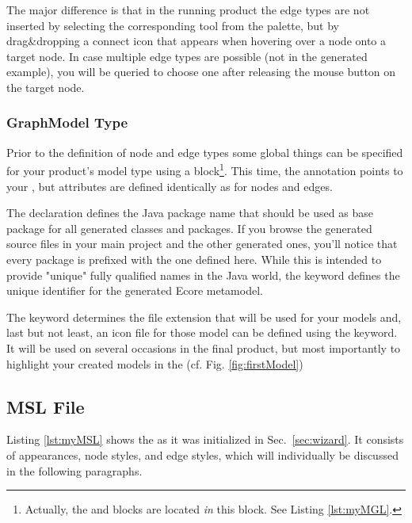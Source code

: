 \documentclass[a4paper,american,12pt]{scrreprt}
\begin{document}
The major difference is that in the running \cinco product the edge types are
not inserted by selecting the corresponding tool from the palette, but by
drag\&dropping a connect icon that appears when hovering over a node onto a
target node. In case multiple edge types are possible (not in the generated
example), you will be queried to choose one after releasing the mouse button on
the target node.

\subsubsection{GraphModel Type}

Prior to the definition of node and edge types some global things can be specified for your \cinco
product's model type using a   block\footnote{Actually, the 
and  blocks are located \emph{in} this  block. See
Listing \ref{lst:myMGL}.}.  This time,
the  annotation points to your , but
attributes are defined identically as for nodes and edges.

The  declaration defines the Java package name that should be used
as base package for all generated classes and packages. If you browse the
generated source files in your main project and the other generated ones, you'll
notice that every package is prefixed with the one defined here. While this is
intended to provide "unique" fully qualified names in the Java world, the
 keyword defines the unique identifier for the generated Ecore
metamodel.

The  keyword determines the file extension that will be
used for your models and, last but not least, an icon file for those model can
be defined using the  keyword. It will be used on several occasions
in the final product, but most importantly to highlight your created models in
the  (cf. Fig. \ref{fig:firstModel}) 

\subsection{MSL File} \label{sec:msl}


Listing \ref{lst:myMSL} shows the  as it was initialized
in Sec.~\ref{sec:wizard}. It consists of appearances, node styles, and
edge styles, which will individually be discussed in the following paragraphs.
\end{document}
